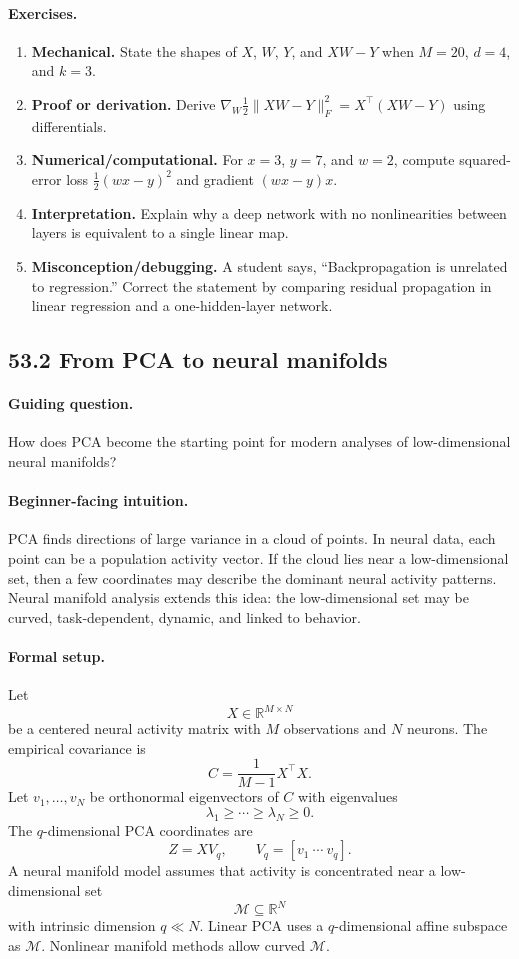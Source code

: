 \paragraph{Exercises.}
\begin{enumerate}[label=\textbf{53.1.\arabic*.}, leftmargin=*]
\item \textbf{Mechanical.} State the shapes of \(X\), \(W\), \(Y\), and \(XW-Y\) when \(M=20\), \(d=4\), and \(k=3\).
\item \textbf{Proof or derivation.} Derive \(\nabla_W \frac12\|XW-Y\|_F^2=X^\top(XW-Y)\) using differentials.
\item \textbf{Numerical/computational.} For \(x=3\), \(y=7\), and \(w=2\), compute squared-error loss \(\frac12(wx-y)^2\) and gradient \((wx-y)x\).
\item \textbf{Interpretation.} Explain why a deep network with no nonlinearities between layers is equivalent to a single linear map.
\item \textbf{Misconception/debugging.} A student says, ``Backpropagation is unrelated to regression.'' Correct the statement by comparing residual propagation in linear regression and a one-hidden-layer network.
\end{enumerate}

\subsection{53.2 From PCA to neural manifolds}

\paragraph{Guiding question.}
How does PCA become the starting point for modern analyses of low-dimensional neural manifolds?

\paragraph{Beginner-facing intuition.}
PCA finds directions of large variance in a cloud of points. In neural data, each point can be a population activity vector. If the cloud lies near a low-dimensional set, then a few coordinates may describe the dominant neural activity patterns. Neural manifold analysis extends this idea: the low-dimensional set may be curved, task-dependent, dynamic, and linked to behavior.

\paragraph{Formal setup.}
Let
\[
X\in\mathbb R^{M\times N}
\]
be a centered neural activity matrix with \(M\) observations and \(N\) neurons. The empirical covariance is
\[
C=\frac{1}{M-1}X^\top X.
\]
Let \(v_1,\ldots,v_N\) be orthonormal eigenvectors of \(C\) with eigenvalues
\[
\lambda_1\geq\cdots\geq\lambda_N\geq0.
\]
The \(q\)-dimensional PCA coordinates are
\[
Z=XV_q,\qquad V_q=[v_1\ \cdots\ v_q].
\]
A neural manifold model assumes that activity is concentrated near a low-dimensional set
\[
\mathcal M\subseteq\mathbb R^N
\]
with intrinsic dimension \(q\ll N\). Linear PCA uses a \(q\)-dimensional affine subspace as \(\mathcal M\). Nonlinear manifold methods allow curved \(\mathcal M\).

